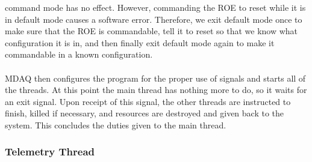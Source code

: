 command mode has no effect. However, commanding the ROE to reset while it is in default mode causes a 
software error. Therefore, we exit default mode once to make sure that the ROE is commandable, tell it to reset
so that we know what configuration it is in, and then finally exit default mode again to make it commandable
in a known configuration.
\\\\
MDAQ then configures the program for the proper use of signals and starts all of the threads. At this point
the main thread has nothing more to do, so it waits for an exit signal. Upon receipt of this signal, the
other threads are instructed to finish, killed if necessary, and resources are destroyed and given back to the
system. This concludes the duties given to the main thread.

\subsubsection{Telemetry Thread}

